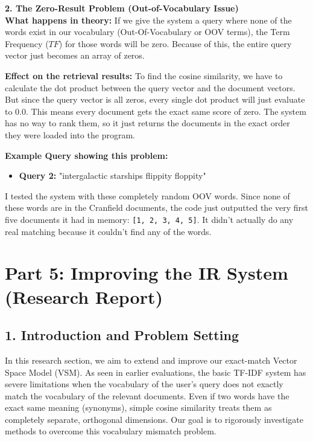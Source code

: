 \documentclass{svproc}
\begin{document}
\textbf{2. The Zero-Result Problem (Out-of-Vocabulary Issue)} \\
\textbf{What happens in theory:} If we give the system a query where none of the words exist in our vocabulary (Out-Of-Vocabulary or OOV terms), the Term Frequency ($TF$) for those words will be zero. Because of this, the entire query vector just becomes an array of zeros.

\textbf{Effect on the retrieval results:} To find the cosine similarity, we have to calculate the dot product between the query vector and the document vectors. But since the query vector is all zeros, every single dot product will just evaluate to $0.0$. This means every document gets the exact same score of zero. The system has no way to rank them, so it just returns the documents in the exact order they were loaded into the program.

\textbf{Example Query showing this problem:}
\begin{itemize}
    \item \textbf{Query 2:} "intergalactic starships flippity floppity"
\end{itemize}
I tested the system with these completely random OOV words. Since none of these words are in the Cranfield documents, the code just outputted the very first five documents it had in memory: \texttt{[1, 2, 3, 4, 5]}. It didn't actually do any real matching because it couldn't find any of the words.
\section*{Part 5: Improving the IR System (Research Report)}

\subsection*{1. Introduction and Problem Setting}
In this research section, we aim to extend and improve our exact-match Vector Space Model (VSM). As seen in earlier evaluations, the basic TF-IDF system has severe limitations when the vocabulary of the user's query does not exactly match the vocabulary of the relevant documents. Even if two words have the exact same meaning (synonyms), simple cosine similarity treats them as completely separate, orthogonal dimensions. Our goal is to rigorously investigate methods to overcome this vocabulary mismatch problem.
\end{document}
